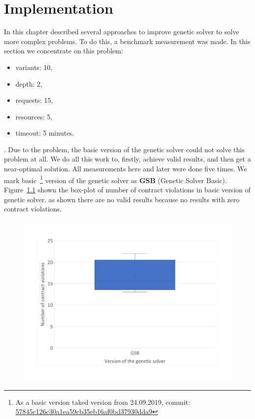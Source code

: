 \chapter{Implementation}\label{chapter:Implementation}
In this chapter described several approaches to improve genetic solver to solve more complex problems.
To do this, a benchmark measurement was made.
In this section we concentrate on this problem:
\begin{itemize}
	\item variants: 10,
	\item depth: 2,
	\item requests: 15,
	\item resources: 5,
	\item timeout: 5 minutes.
\end{itemize}.
Due to the problem, the basic version of the genetic solver could not solve this problem at all. We do all this work to, firstly, achieve valid results, and then get a near-optimal solution. 
All measurements here and later were done five times.
We mark basic~\footnote{As a basic version taked version from 24.09.2019, commit: \href{https://git-st.inf.tu-dresden.de/mquat/mquat2/commit/57845c126c30a1ea59cb35eb16af0bd37930dda9}{57845c126c30a1ea59cb35eb16af0bd37930dda9}} version of the genetic solver as \textbf{GSB} (Genetic Solver Basic).
Figure~\ref{fig:boxplotsolverbasic} shown the box-plot of number of contract violations in basic version of genetic solver, as shown there are no valid results because no results with zero contract violations.

\begin{figure}
	\centering
	\includegraphics[width=\textwidth]{images/BoxPlotSolverBasic}
	\caption[Boxplot with a number of contract violations for the basic version of genetic solver]{}
	\label{fig:boxplotsolverbasic}
\end{figure}


